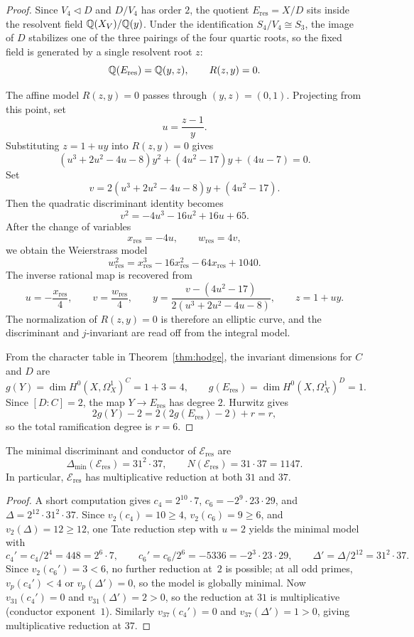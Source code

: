 \begin{proof}
Since \(V_4\triangleleft D\) and \(D/V_4\) has order \(2\), the quotient \(E_{\mathrm{res}}=X/D\) sits inside the resolvent field \(\mathbb{Q}(X_V)/\mathbb{Q}(y)\). Under the identification \(S_4/V_4\cong S_3\), the image of \(D\) stabilizes one of the three pairings of the four quartic roots, so the fixed field is generated by a single resolvent root \(z\):
\[
\mathbb{Q}(E_{\mathrm{res}})=\mathbb{Q}(y,z),\qquad R(z,y)=0.
\]

The affine model \(R(z,y)=0\) passes through \((y,z)=(0,1)\). Projecting from this point, set
\[
u=\frac{z-1}{y}.
\]
Substituting \(z=1+uy\) into \(R(z,y)=0\) gives
\[
(u^3+2u^2-4u-8)y^2+(4u^2-17)y+(4u-7)=0.
\]
Set
\[
v=2(u^3+2u^2-4u-8)y+(4u^2-17).
\]
Then the quadratic discriminant identity becomes
\[
v^2=-4u^3-16u^2+16u+65.
\]
After the change of variables
\[
 x_{\mathrm{res}}=-4u,\qquad w_{\mathrm{res}}=4v,
\]
we obtain the Weierstrass model
\[
 w_{\mathrm{res}}^2=x_{\mathrm{res}}^3-16x_{\mathrm{res}}^2-64x_{\mathrm{res}}+1040.
\]
The inverse rational map is recovered from
\[
 u=-\frac{x_{\mathrm{res}}}{4},\qquad
 v=\frac{w_{\mathrm{res}}}{4},\qquad
 y=\frac{v-(4u^2-17)}{2(u^3+2u^2-4u-8)},\qquad
 z=1+uy.
\]
The normalization of \(R(z,y)=0\) is therefore an elliptic curve, and the discriminant and \(j\)-invariant are read off from the integral model.

From the character table in Theorem~\ref{thm:hodge}, the invariant dimensions for \(C\) and \(D\) are
\[
g(Y)=\dim H^0(X,\Omega_X^1)^C=1+3=4,\qquad
g(E_{\mathrm{res}})=\dim H^0(X,\Omega_X^1)^D=1.
\]
Since \([D:C]=2\), the map \(Y\to E_{\mathrm{res}}\) has degree \(2\). Hurwitz gives
\[
2g(Y)-2=2(2g(E_{\mathrm{res}})-2)+r=r,
\]
so the total ramification degree is \(r=6\).
\end{proof}

\begin{proposition}\label{prop:eres-conductor}
The minimal discriminant and conductor of \(\mathcal E_{\mathrm{res}}\) are
\[
\Delta_{\min}(\mathcal E_{\mathrm{res}})=31^2\cdot 37,
\qquad
N(\mathcal E_{\mathrm{res}})=31\cdot 37=1147.
\]
In particular, \(\mathcal E_{\mathrm{res}}\) has multiplicative reduction at both \(31\) and \(37\).
\end{proposition}

\begin{proof}
A short computation gives \(c_4=2^{10}\cdot 7\), \(c_6=-2^9\cdot 23\cdot 29\), and \(\Delta=2^{12}\cdot 31^2\cdot 37\).
Since \(v_2(c_4)=10\ge 4\), \(v_2(c_6)=9\ge 6\), and \(v_2(\Delta)=12\ge 12\), one Tate reduction step with \(u=2\) yields the minimal model with
\[
c_4'=c_4/2^4=448=2^6\cdot 7,
\qquad
c_6'=c_6/2^6=-5336=-2^3\cdot 23\cdot 29,
\qquad
\Delta'=\Delta/2^{12}=31^2\cdot 37.
\]
Since \(v_2(c_6')=3<6\), no further reduction at~\(2\) is possible; at all odd primes, \(v_p(c_4')<4\) or \(v_p(\Delta')=0\), so the model is globally minimal.
Now \(v_{31}(c_4')=0\) and \(v_{31}(\Delta')=2>0\), so the reduction at \(31\) is multiplicative (conductor exponent~\(1\)).
Similarly \(v_{37}(c_4')=0\) and \(v_{37}(\Delta')=1>0\), giving multiplicative reduction at \(37\).
\end{proof}

